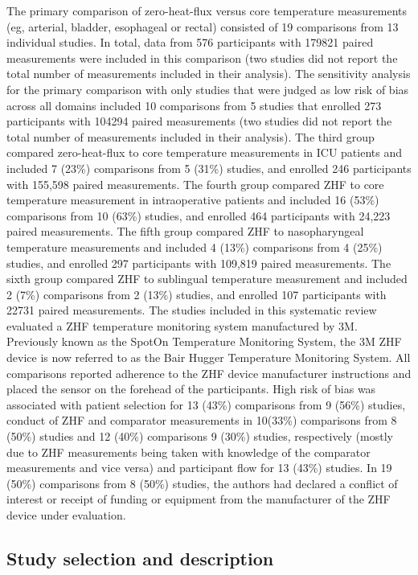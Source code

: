 \documentclass[smallextended]{svjour3}       %
\begin{document}
The primary comparison of zero-heat-flux versus core temperature
measurements (eg, arterial, bladder, esophageal or rectal) consisted of
19 comparisons from 13 individual studies. In total, data from 576
participants with 179821 paired measurements were included in this
comparison (two studies did not report the total number of measurements
included in their analysis). The sensitivity analysis for the primary
comparison with only studies that were judged as low risk of bias across
all domains included 10 comparisons from 5 studies that enrolled 273
participants with 104294 paired measurements (two studies did not report
the total number of measurements included in their analysis). The third
group compared zero-heat-flux to core temperature measurements in ICU
patients and included 7 (23\%) comparisons from 5 (31\%) studies, and
enrolled 246 participants with 155,598 paired measurements. The fourth
group compared ZHF to core temperature measurement in intraoperative
patients and included 16 (53\%) comparisons from 10 (63\%) studies, and
enrolled 464 participants with 24,223 paired measurements. The fifth
group compared ZHF to nasopharyngeal temperature measurements and
included 4 (13\%) comparisons from 4 (25\%) studies, and enrolled 297
participants with 109,819 paired measurements. The sixth group compared
ZHF to sublingual temperature measurement and included 2 (7\%)
comparisons from 2 (13\%) studies, and enrolled 107 participants with
22731 paired measurements. The studies included in this systematic
review evaluated a ZHF temperature monitoring system manufactured by 3M.
Previously known as the SpotOn Temperature Monitoring System, the 3M ZHF
device is now referred to as the Bair Hugger Temperature Monitoring
System. All comparisons reported adherence to the ZHF device
manufacturer instructions and placed the sensor on the forehead of the
participants. High risk of bias was associated with patient selection
for 13 (43\%) comparisons from 9 (56\%) studies, conduct of ZHF and
comparator measurements in 10(33\%) comparisons from 8 (50\%) studies
and 12 (40\%) comparisons 9 (30\%) studies, respectively (mostly due to
ZHF measurements being taken with knowledge of the comparator
measurements and vice versa) and participant flow for 13 (43\%) studies.
In 19 (50\%) comparisons from 8 (50\%) studies, the authors had declared
a conflict of interest or receipt of funding or equipment from the
manufacturer of the ZHF device under evaluation.

\hypertarget{study-selection-and-description}{%
\subsection{Study selection and
description}\label{study-selection-and-description}}
\end{document}
